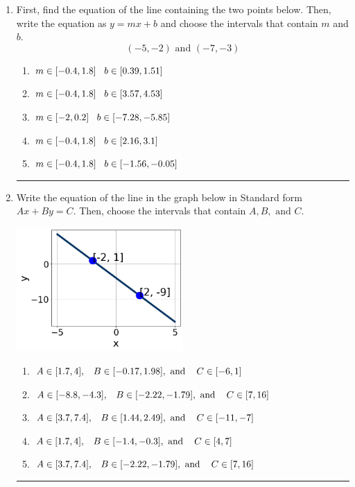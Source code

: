 \documentclass[14pt]{extbook}
\newcommand{\litem}[1]{\item#1\hspace*{-1cm}\rule{\textwidth}{0.4pt}}
\begin{document}
\begin{enumerate}
{\begin{enumerate}[label=\Alph*.]
\end{enumerate} }
\litem{
First, find the equation of the line containing the two points below. Then, write the equation as $ y=mx+b $ and choose the intervals that contain $m$ and $b$.\[ (-5, -2) \text{ and } (-7, -3) \]\begin{enumerate}[label=\Alph*.]
\item \( m \in [-0.4, 1.8] \hspace*{3mm} b \in [0.39, 1.51] \)
\item \( m \in [-0.4, 1.8] \hspace*{3mm} b \in [3.57, 4.53] \)
\item \( m \in [-2, 0.2] \hspace*{3mm} b \in [-7.28, -5.85] \)
\item \( m \in [-0.4, 1.8] \hspace*{3mm} b \in [2.16, 3.1] \)
\item \( m \in [-0.4, 1.8] \hspace*{3mm} b \in [-1.56, -0.05] \)

\end{enumerate} }
\litem{
Write the equation of the line in the graph below in Standard form $Ax+By=C$. Then, choose the intervals that contain $A, B, \text{ and } C$.
\begin{center}
    \includegraphics[width=0.5\textwidth]{../Figures/linearGraphToStandardA.png}
\end{center}
\begin{enumerate}[label=\Alph*.]
\item \( A \in [1.7, 4], \hspace{3mm} B \in [-0.17, 1.98], \text{ and } \hspace{3mm} C \in [-6, 1] \)
\item \( A \in [-8.8, -4.3], \hspace{3mm} B \in [-2.22, -1.79], \text{ and } \hspace{3mm} C \in [7, 16] \)
\item \( A \in [3.7, 7.4], \hspace{3mm} B \in [1.44, 2.49], \text{ and } \hspace{3mm} C \in [-11, -7] \)
\item \( A \in [1.7, 4], \hspace{3mm} B \in [-1.4, -0.3], \text{ and } \hspace{3mm} C \in [4, 7] \)
\item \( A \in [3.7, 7.4], \hspace{3mm} B \in [-2.22, -1.79], \text{ and } \hspace{3mm} C \in [7, 16] \)

\end{enumerate} }
\end{enumerate}
\end{document}

